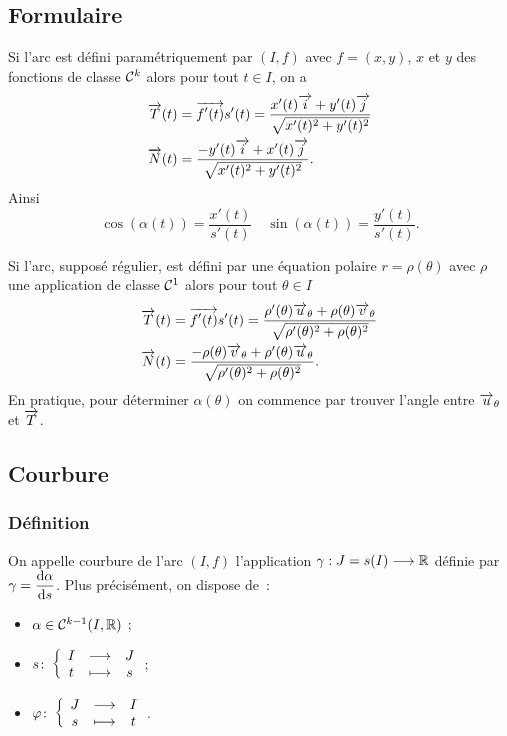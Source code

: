 \subsection{Formulaire}

Si l'arc est défini paramétriquement par $(I,f)$ avec $f=(x,y)$, $x$ et $y$ des fonctions de classe $\mathcal{C}^{k}$ alors pour tout $t \in I$, on a
\begin{align}
  \overrightarrow{T}(t) &= \overrightarrow{f'(t)}{s'(t)} = \frac{x'(t)\overrightarrow{i}+y'(t)\overrightarrow{j}}{\sqrt{x'(t)^2+y'(t)^2}} \\
  \overrightarrow{N}(t) &= \frac{-y'(t)\overrightarrow{i}+x'(t)\overrightarrow{j}}{\sqrt{x'(t)^2+y'(t)^2}}.
\end{align}
Ainsi
\begin{equation}
  \cos(\alpha(t)) = \frac{x'(t)}{s'(t)} \quad \sin(\alpha(t)) = \frac{y'(t)}{s'(t)}.
\end{equation}

Si l'arc, supposé régulier, est défini par une équation polaire $r=\rho(\theta)$ avec $\rho$ une application de classe $\mathcal{C}^{1}$ alors pour tout $\theta \in I$
\begin{align}
  \overrightarrow{T}(t) &= \overrightarrow{f'(t)}{s'(t)} = \frac{\rho'(\theta)\overrightarrow{u}_\theta+\rho(\theta)\overrightarrow{v}_\theta}{\sqrt{\rho'(\theta)^2+\rho(\theta)^2}} \\
  \overrightarrow{N}(t) &= \frac{-\rho(\theta)\overrightarrow{v}_\theta+\rho'(\theta)\overrightarrow{u}_\theta}{\sqrt{\rho'(\theta)^2+\rho(\theta)^2}}.
\end{align}
En pratique, pour déterminer $\alpha(\theta)$ on commence par trouver l'angle entre $\overrightarrow{u}_\theta$ et $\overrightarrow{T}$.

\subsection{Courbure}

\subsubsection{Définition}

On appelle courbure de l'arc $(I, f)$ l'application $\gamma : J=s(I) \longrightarrow \mathbb{R}$ définie par $\gamma=\dfrac{\mathrm{d} \alpha}{\mathrm{d} s}$. Plus précisément, on dispose de~:
\begin{itemize}
\item $\alpha \in \mathcal{C}^{k-1}(I, \mathbb{R})$ ;
\item $s\colon \left\{\begin{array}{ccc} I & \longrightarrow &J\\ t & \longmapsto & s \end{array} \right.$;
\item $\varphi\colon \left\{\begin{array}{ccc} J & \longrightarrow &I\\ s & \longmapsto & t \end{array} \right.$.
\end{itemize}

